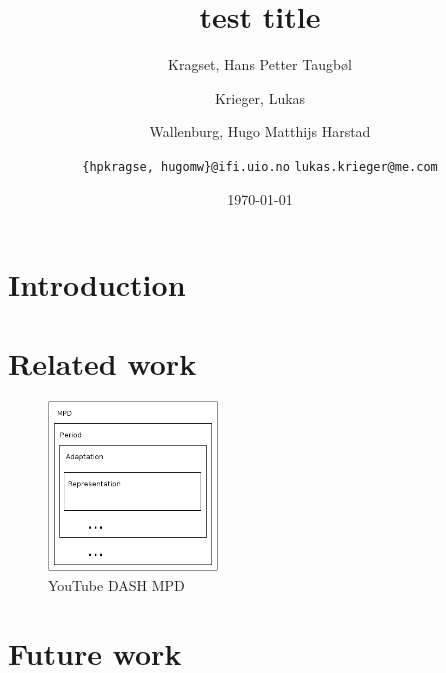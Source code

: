 \documentclass[10pt,journal]{IEEEtran}
\title{test title}
\author{
	Kragset, Hans Petter Taugb\o l
	\and
	Krieger, Lukas
	\and
	Wallenburg, Hugo Matthijs Harstad
	\and
	\newline
	\texttt{\{hpkragse, hugomw\}@ifi.uio.no}
	\texttt{lukas.krieger@me.com}
}
\date{\today}
\begin{document}
\maketitle

\begin{abstract}
	\lipsum[1]
\end{abstract}

\section{Introduction}


\section{Related work}
\lipsum[1-15]



\begin{figure}
	\centering
	\includegraphics[width=0.4\textwidth]{figures/yt-dash.png}
	\caption{YouTube DASH MPD}
\end{figure}







\section{Future work}

\lipsum[1-4]



\lipsum[1-4]

%

\end{document}
